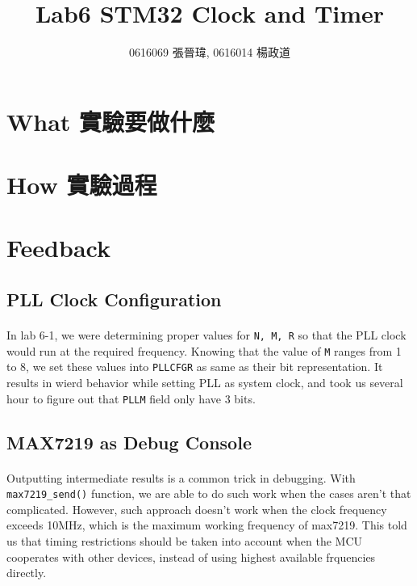 \title{Lab6 STM32 Clock and Timer}
\author{0616069 張晉瑋, 0616014 楊政道}
\maketitle
\thispagestyle{fancy}
\section{What 實驗要做什麼}
\paragraph{}
\section{How 實驗過程}
\paragraph{}
\section{Feedback}
\subsection{PLL Clock Configuration}
\paragraph{}
In lab 6-1, we were determining proper values for \texttt{N, M, R} so that the PLL clock would run at the required frequency.
Knowing that the value of \texttt{M} ranges from 1 to 8, we set these values into \texttt{PLLCFGR} as same as their bit representation.
It results in wierd behavior while setting PLL as system clock, 
and took us several hour to figure out that \texttt{PLLM} field only have 3 bits.
\subsection{MAX7219 as Debug Console}
\paragraph{}
Outputting intermediate results is a common trick in debugging. 
With \texttt{max7219\_send()} function, we are able to do such work when the cases aren't that complicated.
However, such approach doesn't work when the clock frequency exceeds 10MHz, which is the maximum working frequency of max7219.
This told us that timing restrictions should be taken into account when the MCU cooperates with other devices, 
instead of using highest available frquencies directly.
